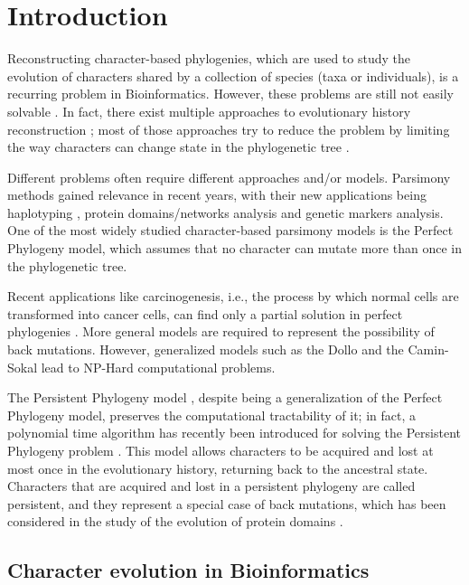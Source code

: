 
\section{Introduction}\label{section:introduction}

Reconstructing character-based phylogenies, which are used to study the evolution of characters shared by a collection of species (taxa or individuals), is a recurring problem in Bioinformatics.
However, these problems are still not easily solvable \cite{DPQ2011}.
In fact, there exist multiple approaches to evolutionary history reconstruction \cite{SD2003, MPL2004, BI2001}; most of those approaches try to reduce the problem by limiting the way characters can change state in the phylogenetic tree \cite{CS1990, PPptime1994}.

Different problems often require different approaches and/or models.
Parsimony methods gained relevance in recent years, with their new applications being haplotyping \cite{PPHltime2005, PPHltime2007}, protein domains/networks analysis and genetic markers analysis.
One of the most widely studied character-based parsimony models is the Perfect Phylogeny model, which assumes that no character can mutate more than once in the phylogenetic tree.

Recent applications like carcinogenesis, i.e., the process by which normal cells are transformed into cancer cells, can find only a partial solution in perfect phylogenies \cite{PPE2014}.
More general models are required to represent the possibility of back mutations.
However, generalized models such as the Dollo and the Camin-Sokal lead to NP-Hard computational problems.

The Persistent Phylogeny model \cite{PPPbin2012}, despite being a generalization of the Perfect Phylogeny model, preserves the computational tractability of it; in fact, a polynomial time algorithm has recently been introduced for solving the Persistent Phylogeny problem \cite{PPPptime2016}.
This model allows characters to be acquired and lost at most once in the evolutionary history, returning back to the ancestral state.
Characters that are acquired and lost in a persistent phylogeny are called persistent, and they represent a special case of back mutations, which has been considered in the study of the evolution of protein domains \cite{CPPP2014}.

\subsection{Character evolution in Bioinformatics}\label{section:character-evolution}

